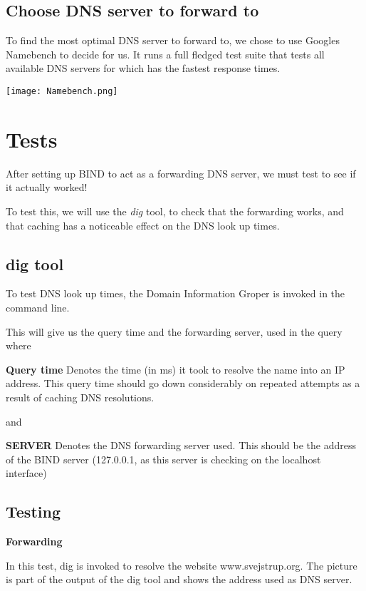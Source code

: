 \subsection{Choose DNS server to forward to}
To find the most optimal DNS server to forward to, we chose to use Googles Namebench to decide for us. It runs a full fledged test suite that tests all available DNS servers for which has the fastest response times.  

\begin{center}
	\texttt{[image: Namebench.png]}
\end{center}



\section{Tests}
After setting up BIND to act as a forwarding DNS server, we must test to see if it actually worked!

To test this, we will use the \textit{dig} tool, to check that the forwarding works, and that caching has a noticeable effect on the DNS look up times. 
\subsection{dig tool}
To test DNS look up times, the Domain Information Groper is invoked in the command line.

This will give us the query time and the forwarding server, used in the query where

\textbf{Query time}
Denotes the time (in ms) it took to resolve the name into an IP address.
This query time should go down considerably on repeated attempts as a result of caching DNS resolutions.

and

\textbf{SERVER}
Denotes the DNS forwarding server used. This should be the address of the BIND server (127.0.0.1, as this server is checking on the localhost interface)

\subsection{Testing}
\textbf{Forwarding}

In this test, dig is invoked to resolve the website www.svejstrup.org. 
The picture is part of the output of the dig tool and shows the address used as DNS server.

